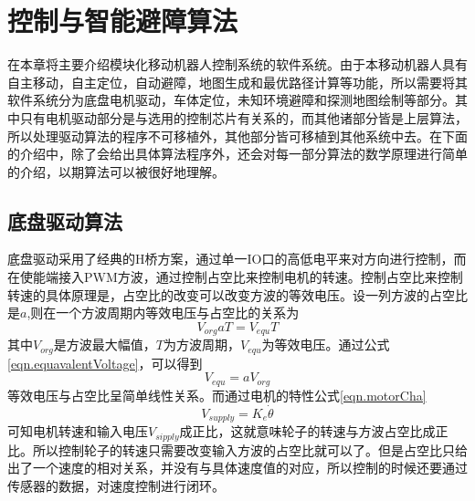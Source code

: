 

\chapter{控制与智能避障算法}
\label{chap:algorithm}

在本章将主要介绍模块化移动机器人控制系统的软件系统。由于本移动机器人具有自主移动，自主定位，自动避障，地图生成和最优路径计算等功能，所以需要将其软件系统分为底盘电机驱动，车体定位，未知环境避障和探测地图绘制等部分。其中只有电机驱动部分是与选用的控制芯片有关系的，而其他诸部分皆是上层算法，所以处理驱动算法的程序不可移植外，其他部分皆可移植到其他系统中去。在下面的介绍中，除了会给出具体算法程序外，还会对每一部分算法的数学原理进行简单的介绍，以期算法可以被很好地理解。

\section{底盘驱动算法}
底盘驱动采用了经典的H桥方案，通过单一IO口的高低电平来对方向进行控制，而在使能端接入PWM方波，通过控制占空比来控制电机的转速。控制占空比来控制转速的具体原理是，占空比的改变可以改变方波的等效电压。设一列方波的占空比是$a$,则在一个方波周期内等效电压与占空比的关系为 \\
\begin{equation}\label{eqn.equavalentVoltage}
V_{org}aT=V_{equ}T
\end{equation}
其中$V_{org}$是方波最大幅值，$T$为方波周期，$V_{equ}$为等效电压。通过公式\eqref{eqn.equavalentVoltage}，可以得到\\
\begin{equation}
V_{equ} = aV_{org}
\end{equation}
等效电压与占空比呈简单线性关系。而通过电机的特性公式\eqref{eqn.motorCha} \\
\begin{equation}\label{eqn.motorCha}
V_{supply} = K_{e}\dot{\theta}
\end{equation}
可知电机转速和输入电压$V_{sipply}$成正比，这就意味轮子的转速与方波占空比成正比。所以控制轮子的转速只需要改变输入方波的占空比就可以了。但是占空比只给出了一个速度的相对关系，并没有与具体速度值的对应，所以控制的时候还要通过传感器的数据，对速度控制进行闭环。

